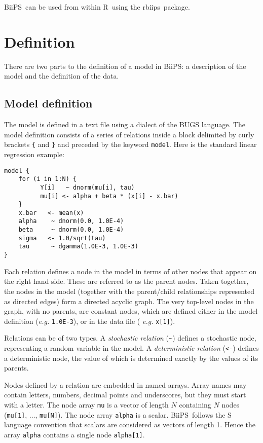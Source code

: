 \documentclass[11pt, a4paper, titlepage]{report}
\newcommand{\biips}{\textsf{BiiPS}}
\newcommand{\rbiips}{\textsf{rbiips}}
\newcommand{\R}{\textsf{R}}
\begin{document}
\biips\ can be used from within \R\ using the \rbiips\ package.

\section{Definition}

There are two parts to the definition of a model in \biips: a
description of the model and the definition of the data.

\subsection{Model definition}

The model is defined in a text file using a dialect of the
BUGS language.  The model definition consists of a series of
relations inside a block delimited by curly brackets \verb+{+ and
\verb+}+ and preceded by the keyword \verb+model+. Here is the standard
linear regression example:

\begin{verbatim}
model {
    for (i in 1:N) {
          Y[i]   ~ dnorm(mu[i], tau)
          mu[i] <- alpha + beta * (x[i] - x.bar)
    }
    x.bar   <- mean(x)
    alpha    ~ dnorm(0.0, 1.0E-4)
    beta     ~ dnorm(0.0, 1.0E-4)
    sigma   <- 1.0/sqrt(tau)
    tau      ~ dgamma(1.0E-3, 1.0E-3)
}
\end{verbatim}

Each relation defines a node in the model in terms of other nodes that
appear on the right hand side. These are referred to as the parent
nodes. Taken together, the nodes in the model (together with the
parent/child relationships represented as directed edges) form a
directed acyclic graph. The very top-level nodes in the graph, with no
parents, are constant nodes, which are defined either in the model
definition ({\em e.g.}  \verb+1.0E-3+), or in the data file ({\em
  e.g.}  \verb+x[1]+).

Relations can be of two types. A {\em stochastic relation} (\verb+~+)
defines a stochastic node, representing a random variable in the
model. A {\em deterministic relation} (\verb+<-+) defines a
deterministic node, the value of which is determined exactly by the
values of its parents.

Nodes defined by a relation are embedded in named arrays. Array names may
contain letters, numbers, decimal points and underscores, but they must
start with a letter.  The node array \verb+mu+ is a vector of length
$N$ containing $N$ nodes (\verb+mu[1]+, $\ldots$, \verb+mu[N]+). The
node array \verb+alpha+ is a scalar.  \biips\ follows the S language
convention that scalars are considered as vectors of length 1. Hence
the array \verb+alpha+ contains a single node \verb+alpha[1]+.
\end{document}
